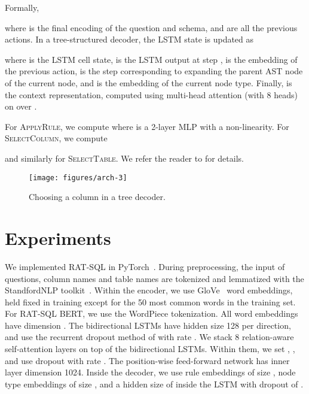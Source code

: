 \documentclass[11pt,a4paper,final]{article}
\begin{document}
Formally,

where  is the final encoding of the question and schema,
and  are all the previous actions.
In a tree-structured decoder, the LSTM state is updated as

where  is the LSTM cell state,  is the LSTM output at step ,  is the
embedding of the previous action,  is the step corresponding to expanding the parent AST node of the current node,
and  is the embedding of the current node type.
Finally,  is the context representation, computed using multi-head attention (with 8 heads) on
 over .

For \textsc{ApplyRule}, we compute 
where  is a 2-layer MLP with a  non-linearity.
For \textsc{SelectColumn}, we compute

and similarly for \textsc{SelectTable}.
We refer the reader to \citet{yinSyntacticNeuralModel2017a} for details.

\begin{figure}
    \centering
    \texttt{[image: figures/arch-3]}
    \caption{Choosing a column in a tree decoder.}
    \label{fig:decoder}
    \vspace{-\baselineskip}
\end{figure}

 \section{Experiments}
\label{sec:experiments}

We implemented RAT-SQL in PyTorch~\citep{paszkeAutomaticDifferentiationPyTorch2017}.
During preprocessing, the input of questions, column names and table names are tokenized and lemmatized with the StandfordNLP toolkit~\citep{corenlp}.
Within the encoder, we use GloVe~\citep{pennington2014glove} word embeddings, held fixed in training except for the 50 most common words in the training set.
For RAT-SQL BERT, we use the WordPiece tokenization.
All word embeddings have dimension .
The bidirectional LSTMs have hidden size 128 per direction, and use the recurrent dropout method of
\citet{galTheoreticallyGroundedApplication2016} with rate .
We stack 8 relation-aware self-attention layers on top of the bidirectional LSTMs.
Within them, we set , , and use dropout with rate .
The position-wise feed-forward network has inner layer dimension 1024.
Inside the decoder, we use rule embeddings of size , node type embeddings of size , and a hidden size of 
inside the LSTM with dropout of .
\end{document}
